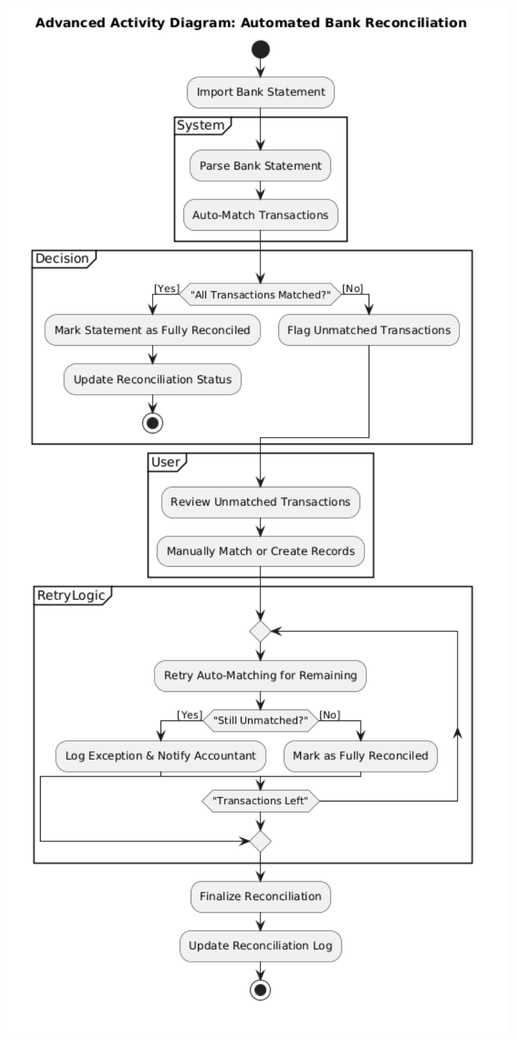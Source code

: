 \documentclass[11pt,a4paper]{article}
\begin{document}
\begin{minipage}{0.45\textwidth}
    \centering
    \includegraphics[width=\linewidth]{diagram/advanced_activity.png}
\end{minipage}
\bigskip
\end{document}
